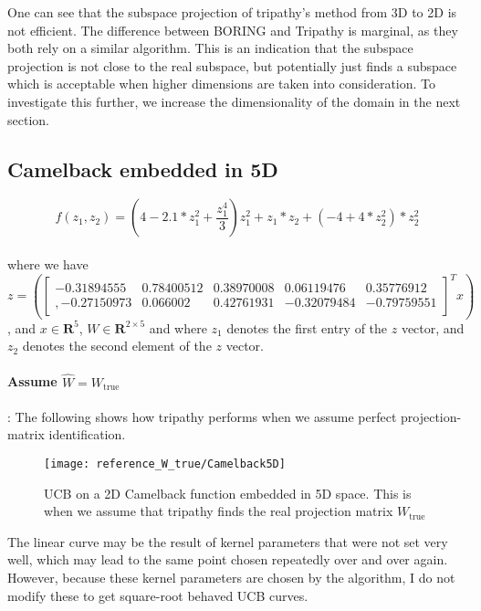 One can see that the subspace projection of tripathy's method from 3D to 2D is not efficient. 
The difference between BORING and Tripathy is marginal, as they both rely on a similar algorithm.
This is an indication that the subspace projection is not close to the real subspace, but potentially just finds a subspace which is acceptable when higher dimensions are taken into consideration.
To investigate this further, we increase the dimensionality of the domain in the next section.

\subsection{Camelback embedded in 5D}

\def\WCamelback5D{
\begin{bmatrix}
     -0.31894555 & 0.78400512 & 0.38970008 & 0.06119476 & 0.35776912 \\,
     -0.27150973 & 0.066002 & 0.42761931 & -0.32079484 &-0.79759551
\end{bmatrix}}

\begin{equation}
f(z_1, z_2) = \left( 4 - 2.1 * z_1^2 + \frac{z_1^4}{3} \right)  z_1^2 + z_1 *  z_2 + \left(-4 + 4 * z_2^2 \right) * z_2^2
\end{equation} \\

where we have \\
$z = \left( \WCamelback5D^T x \right) $, and $ x \in \mathbf{R}^5$, $W \in \mathbf{R}^{2 \times 5}$
and where $z_1$ denotes the first entry of the $z$ vector, and $z_2$ denotes the second element of the $z$ vector.

\paragraph{Assume $\hat{W} = W_{\text{true}}$}: The following shows how tripathy performs when we assume perfect projection-matrix identification.

\begin{figure}[H]
  \centering
      \texttt{[image: reference\_W\_true/Camelback5D]}
  \caption{UCB on a 2D Camelback function embedded in 5D space.
  This is when we assume that tripathy finds the real projection matrix $W_{\text{true}}$}
\end{figure}

The linear curve may be the result of kernel parameters that were not set very well, which may lead to the same point chosen repeatedly over and over again.
However, because these kernel parameters are chosen by the algorithm, I do not modify these to get square-root behaved UCB curves.

